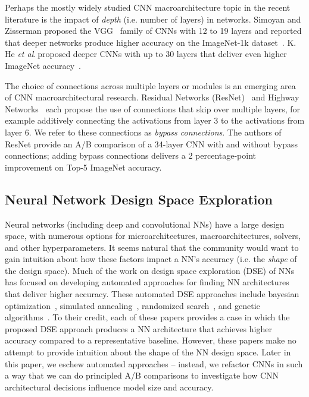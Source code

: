 \documentclass{article} %
\newcommand{\etal}{\textit{et al}.$~$}
\renewcommand{\cite}{\citep}
\def\vsp{\vspace{-0.15in}}
\begin{document}
Perhaps the mostly widely studied CNN macroarchitecture topic in the recent literature is the impact of {\em depth} (i.e. number of layers) in networks.
Simoyan and Zisserman proposed the VGG~\cite{VGG-19} family of CNNs with 12 to 19 layers and reported that deeper networks produce higher accuracy on the ImageNet-1k dataset~\cite{imagenet}.
K. He \etal proposed deeper CNNs with up to 30 layers that deliver even higher ImageNet accuracy~\cite{He2015}.

The choice of connections across multiple layers or modules is an emerging area of CNN macroarchitectural research.
Residual Networks (ResNet)~\cite{resnet} and Highway Networks~\cite{highway-networks} each propose the use of connections that skip over multiple layers, for example additively connecting the activations from layer 3 to the activations from layer 6.
We refer to these connections as {\em bypass connections}.
The authors of ResNet provide an A/B comparison of a 34-layer CNN with and without bypass connections; adding bypass connections delivers a 2 percentage-point improvement on Top-5 ImageNet accuracy.


\subsection{Neural Network Design Space Exploration}
\vsp

Neural networks (including deep and convolutional NNs) have a large design space, with numerous options for microarchitectures, macroarchitectures, solvers, and other hyperparameters.
It seems natural that the community would want to gain intuition about how these factors impact a NN's accuracy (i.e. the {\em shape} of the design space).
Much of the work on design space exploration (DSE) of NNs has focused on developing automated approaches for finding NN architectures that deliver higher accuracy.
These automated DSE approaches include bayesian optimization~\cite{spearmint-paper}, simulated annealing~\cite{simulated-annealing}, randomized search~\cite{randomized-search}, and genetic algorithms~\cite{genetic-algorithms}.
To their credit, each of these papers provides a case in which the proposed DSE approach produces a NN architecture that achieves higher accuracy compared to a representative baseline.
However, these papers make no attempt to provide intuition about the shape of the NN design space.
Later in this paper, we eschew automated approaches -- instead, we refactor CNNs in such a way that we can do principled A/B comparisons to investigate how CNN architectural decisions influence model size and accuracy.
\end{document}
